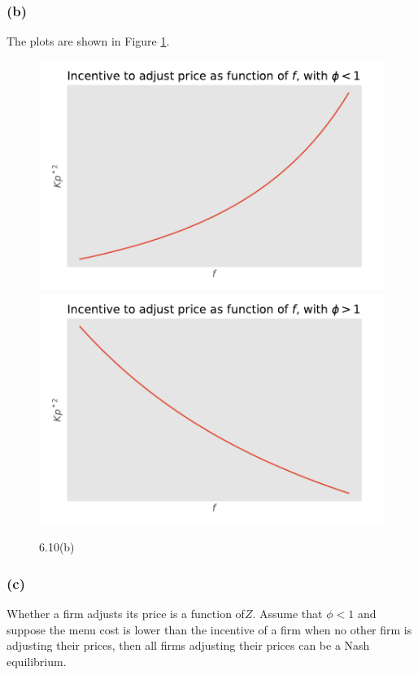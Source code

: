 \documentclass[11pt]{amsart}
\begin{document}
	\subsubsection*{(b)} The plots are shown in Figure \ref{misclabel}.
	\begin{figure}[htbp]
\begin{center}
\includegraphics[scale = 0.4]{phi_less_than_one}
\includegraphics[scale = 0.4]{phi_greater_than_one}
\caption{6.10(b)}
\label{misclabel}
\end{center}
\end{figure}

	
	
	\subsubsection*{(c)} Whether a firm adjusts its price is a function of$Z$. 
	Assume that $\phi <1$ and suppose the menu cost is lower than the incentive of a firm when no other firm is adjusting their prices, then all firms adjusting their prices can be a Nash equilibrium. 
	
\end{document}
